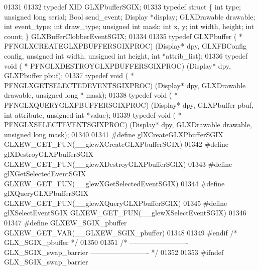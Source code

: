 \begin{DoxyCode}
01331 
01332 \textcolor{keyword}{typedef} XID GLXPbufferSGIX;
01333 \textcolor{keyword}{typedef} \textcolor{keyword}{struct }\{ \textcolor{keywordtype}{int} type; \textcolor{keywordtype}{unsigned} \textcolor{keywordtype}{long} serial; Bool send\_event; Display *display; GLXDrawable drawable; \textcolor{keywordtype}{
      int} event\_type; \textcolor{keywordtype}{int} draw\_type; \textcolor{keywordtype}{unsigned} \textcolor{keywordtype}{int} mask; \textcolor{keywordtype}{int} x, y; \textcolor{keywordtype}{int} width, height; \textcolor{keywordtype}{int} 
      count; \} GLXBufferClobberEventSGIX;
01334 
01335 \textcolor{keyword}{typedef} GLXPbuffer ( * PFNGLXCREATEGLXPBUFFERSGIXPROC) (Display* dpy, GLXFBConfig config, \textcolor{keywordtype}{unsigned} \textcolor{keywordtype}{int} 
      width, \textcolor{keywordtype}{unsigned} \textcolor{keywordtype}{int} height, \textcolor{keywordtype}{int} *attrib\_list);
01336 \textcolor{keyword}{typedef} void ( * PFNGLXDESTROYGLXPBUFFERSGIXPROC) (Display* dpy, GLXPbuffer pbuf);
01337 \textcolor{keyword}{typedef} void ( * PFNGLXGETSELECTEDEVENTSGIXPROC) (Display* dpy, GLXDrawable drawable, \textcolor{keywordtype}{unsigned} \textcolor{keywordtype}{long} *
      mask);
01338 \textcolor{keyword}{typedef} void ( * PFNGLXQUERYGLXPBUFFERSGIXPROC) (Display* dpy, GLXPbuffer pbuf, \textcolor{keywordtype}{int} attribute, \textcolor{keywordtype}{unsigned} \textcolor{keywordtype}{int}
       *value);
01339 \textcolor{keyword}{typedef} void ( * PFNGLXSELECTEVENTSGIXPROC) (Display* dpy, GLXDrawable drawable, \textcolor{keywordtype}{unsigned} \textcolor{keywordtype}{long} 
      mask);
01340 
01341 \textcolor{preprocessor}{#define glXCreateGLXPbufferSGIX GLXEW\_GET\_FUN(\_\_glewXCreateGLXPbufferSGIX)}
01342 \textcolor{preprocessor}{#define glXDestroyGLXPbufferSGIX GLXEW\_GET\_FUN(\_\_glewXDestroyGLXPbufferSGIX)}
01343 \textcolor{preprocessor}{#define glXGetSelectedEventSGIX GLXEW\_GET\_FUN(\_\_glewXGetSelectedEventSGIX)}
01344 \textcolor{preprocessor}{#define glXQueryGLXPbufferSGIX GLXEW\_GET\_FUN(\_\_glewXQueryGLXPbufferSGIX)}
01345 \textcolor{preprocessor}{#define glXSelectEventSGIX GLXEW\_GET\_FUN(\_\_glewXSelectEventSGIX)}
01346 
01347 \textcolor{preprocessor}{#define GLXEW\_SGIX\_pbuffer GLXEW\_GET\_VAR(\_\_GLXEW\_SGIX\_pbuffer)}
01348 
01349 \textcolor{preprocessor}{#endif }\textcolor{comment}{/* GLX\_SGIX\_pbuffer */}\textcolor{preprocessor}{}
01350 
01351 \textcolor{comment}{/* ------------------------- GLX\_SGIX\_swap\_barrier ------------------------- */}
01352 
01353 \textcolor{preprocessor}{#ifndef GLX\_SGIX\_swap\_barrier}

\end{DoxyCode}
